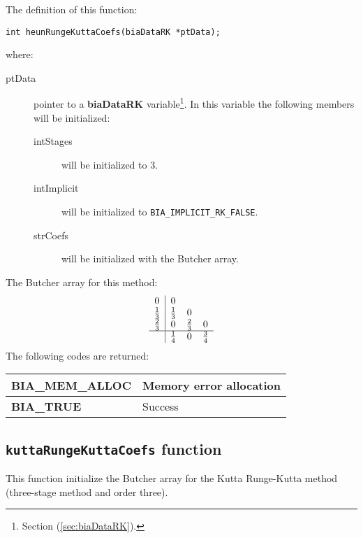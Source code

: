 The definition of this function:
%
\begin{verbatim}
int heunRungeKuttaCoefs(biaDataRK *ptData);
\end{verbatim} 
%
where:
%
\begin{description}
\item[ptData] pointer to a \textbf{biaDataRK} variable\footnote{Section (\ref{sec:biaDataRK}).}. In this variable the following members will be initialized:
%
\begin{description}
%    
\item[intStages] will be initialized to $3$.
%  
\item[intImplicit] will be initialized to \texttt{BIA\_IMPLICIT\_RK\_FALSE}.
%
\item[strCoefs] will be initialized with the Butcher array.
%  
\end{description}
%  
\end{description}
%
The Butcher array for this method:
%
\begin{displaymath}
\begin{array}{c|ccc}
0 & 0 \\
\frac{1}{3} & \frac{1}{3} & 0 \\
\frac{2}{3} & 0 & \frac{2}{3} & 0 \\
\hline
 & \frac{1}{4} & 0 & \frac{3}{4}
\end{array}
\end{displaymath}
%
The following codes are returned:
%
\begin{center}
\begin{tabular}{|l|l|}
\hline
\textbf{BIA\_MEM\_ALLOC} & Memory error allocation \\
\hline
\textbf{BIA\_TRUE} & Success \\
\hline
\end{tabular}
\end{center}

\subsection{\texttt{kuttaRungeKuttaCoefs} function}

This function initialize the Butcher array for the Kutta Runge-Kutta method (three-stage method and order three).\\

